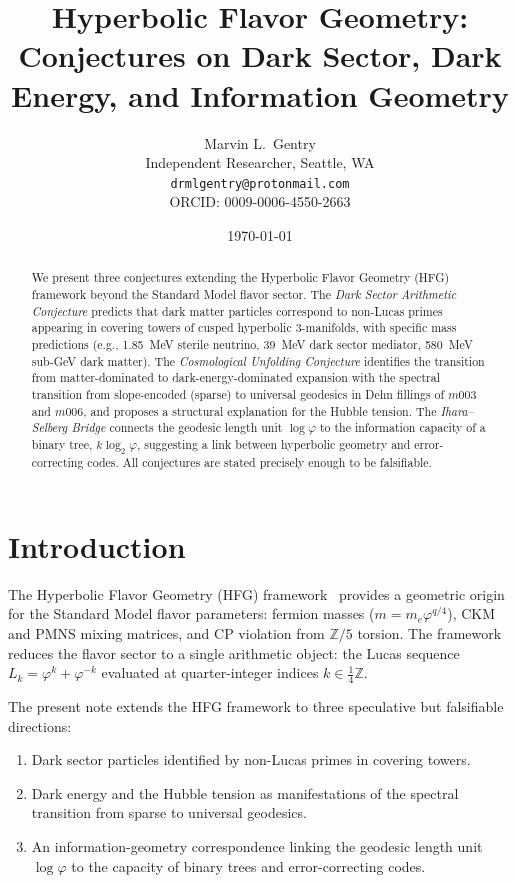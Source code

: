 \documentclass[12pt]{article}
\title{Hyperbolic Flavor Geometry:\\
Conjectures on Dark Sector, Dark Energy, and Information Geometry}
\author{Marvin L.\ Gentry\\
\small Independent Researcher, Seattle, WA\\
\small \texttt{drmlgentry@protonmail.com}\\
\small ORCID: 0009-0006-4550-2663}
\date{\today}
\newcommand{\Z}{\mathbb{Z}}
\newcommand{\ph}{\varphi}
\begin{document}
\maketitle

\begin{abstract}
We present three conjectures extending the Hyperbolic Flavor Geometry
(HFG) framework beyond the Standard Model flavor sector. The
\emph{Dark Sector Arithmetic Conjecture} predicts that dark matter
particles correspond to non-Lucas primes appearing in covering towers
of cusped hyperbolic 3-manifolds, with specific mass predictions
(e.g., 1.85~MeV sterile neutrino, 39~MeV dark sector mediator,
580~MeV sub-GeV dark matter). The \emph{Cosmological Unfolding
Conjecture} identifies the transition from matter-dominated to
dark-energy-dominated expansion with the spectral transition from
slope-encoded (sparse) to universal geodesics in Dehn fillings of
$m003$ and $m006$, and proposes a structural explanation for the
Hubble tension. The \emph{Ihara--Selberg Bridge} connects the
geodesic length unit $\log\ph$ to the information capacity of a
binary tree, $k\log_2\ph$, suggesting a link between hyperbolic
geometry and error-correcting codes. All conjectures are stated
precisely enough to be falsifiable.
\end{abstract}

\section{Introduction}

The Hyperbolic Flavor Geometry (HFG) framework~\cite{Gentry:CKM,
Gentry:PMNS,Gentry:CP,Gentry:Lucas} provides a geometric origin for
the Standard Model flavor parameters: fermion masses
($m = m_e\ph^{q/4}$), CKM and PMNS mixing matrices, and CP violation
from $\mathbb{Z}/5$ torsion. The framework reduces the flavor sector
to a single arithmetic object: the Lucas sequence
$L_k = \ph^k + \ph^{-k}$ evaluated at quarter-integer indices
$k\in\frac{1}{4}\Z$.

The present note extends the HFG framework to three speculative but
falsifiable directions:
\begin{enumerate}
  \item Dark sector particles identified by non-Lucas primes in
        covering towers.
  \item Dark energy and the Hubble tension as manifestations of
        the spectral transition from sparse to universal geodesics.
  \item An information-geometry correspondence linking the
        geodesic length unit $\log\ph$ to the capacity of binary
        trees and error-correcting codes.
\end{enumerate}
\end{document}
